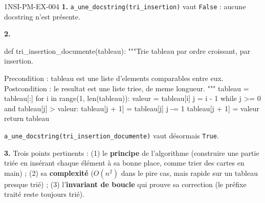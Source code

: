 %
\begin{corrige}{1NSI-PM-EX-004}
\textbf{1.} \lstinline{a_une_docstring(tri_insertion)} vaut \lstinline{False} : aucune
docstring n'est présente.

\textbf{2.}
\begin{python}
def tri_insertion_documente(tableau):
    """Trie tableau par ordre croissant, par insertion.

    Precondition : tableau est une liste d'elements comparables entre eux.
    Postcondition : le resultat est une liste triee, de meme longueur.
    """
    tableau = tableau[:]
    for i in range(1, len(tableau)):
        valeur = tableau[i]
        j = i - 1
        while j >= 0 and tableau[j] > valeur:
            tableau[j + 1] = tableau[j]
            j -= 1
        tableau[j + 1] = valeur
    return tableau
\end{python}
\lstinline{a_une_docstring(tri_insertion_documente)} vaut désormais \lstinline{True}.

\textbf{3.} Trois points pertinents : (1) le \textbf{principe} de l'algorithme (construire
une partie triée en insérant chaque élément à sa bonne place, comme trier des cartes en
main) ; (2) sa \textbf{complexité} ($O(n^2)$ dans le pire cas, mais rapide sur un tableau
presque trié) ; (3) l'\textbf{invariant de boucle} qui prouve sa correction (le préfixe
traité reste toujours trié).
\end{corrige}
